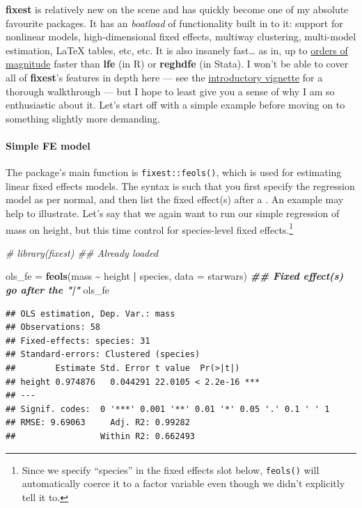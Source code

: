 \documentclass[
]{article}
\newenvironment{Shaded}{\begin{snugshade}}{\end{snugshade}}
\newcommand{\AttributeTok}[1]{\textcolor[rgb]{0.13,0.29,0.53}{#1}}
\newcommand{\CommentTok}[1]{\textcolor[rgb]{0.56,0.35,0.01}{\textit{#1}}}
\newcommand{\DocumentationTok}[1]{\textcolor[rgb]{0.56,0.35,0.01}{\textbf{\textit{#1}}}}
\newcommand{\FunctionTok}[1]{\textcolor[rgb]{0.13,0.29,0.53}{\textbf{#1}}}
\newcommand{\NormalTok}[1]{#1}
\newcommand{\OtherTok}[1]{\textcolor[rgb]{0.56,0.35,0.01}{#1}}
\newcommand{\SpecialCharTok}[1]{\textcolor[rgb]{0.81,0.36,0.00}{\textbf{#1}}}
\begin{document}
\textbf{fixest} is relatively new on the scene and has quickly become
one of my absolute favourite packages. It has an \emph{boatload} of
functionality built in to it: support for nonlinear models,
high-dimensional fixed effects, multiway clustering, multi-model
estimation, LaTeX tables, etc, etc. It is also insanely fast\ldots{} as
in, up to \href{https://lrberge.github.io/fixest/\#benchmarking}{orders
of magnitude} faster than \textbf{lfe} (in R) or \textbf{reghdfe} (in
Stata). I won't be able to cover all of \textbf{fixest}'s features in
depth here --- see the
\href{https://lrberge.github.io/fixest/articles/fixest_walkthrough.html}{introductory
vignette} for a thorough walkthrough --- but I hope to least give you a
sense of why I am so enthusiastic about it. Let's start off with a
simple example before moving on to something slightly more demanding.

\hypertarget{simple-fe-model}{%
\paragraph{Simple FE model}\label{simple-fe-model}}

The package's main function is \texttt{fixest::feols()}, which is used
for estimating linear fixed effects models. The syntax is such that you
first specify the regression model as per normal, and then list the
fixed effect(s) after a \texttt{\textbar{}}. An example may help to
illustrate. Let's say that we again want to run our simple regression of
mass on height, but this time control for species-level fixed
effects.\footnote{Since we specify ``species'' in the fixed effects slot
  below, \texttt{feols()} will automatically coerce it to a factor
  variable even though we didn't explicitly tell it to.}

\begin{Shaded}
\begin{Highlighting}[]
\CommentTok{\# library(fixest) \#\# Already loaded}

\NormalTok{ols\_fe }\OtherTok{=} \FunctionTok{feols}\NormalTok{(mass }\SpecialCharTok{\textasciitilde{}}\NormalTok{ height }\SpecialCharTok{|}\NormalTok{ species, }\AttributeTok{data =}\NormalTok{ starwars) }\DocumentationTok{\#\# Fixed effect(s) go after the "|"}
\NormalTok{ols\_fe}
\end{Highlighting}
\end{Shaded}

\begin{verbatim}
## OLS estimation, Dep. Var.: mass
## Observations: 58 
## Fixed-effects: species: 31
## Standard-errors: Clustered (species) 
##        Estimate Std. Error t value  Pr(>|t|)    
## height 0.974876   0.044291 22.0105 < 2.2e-16 ***
## ---
## Signif. codes:  0 '***' 0.001 '**' 0.01 '*' 0.05 '.' 0.1 ' ' 1
## RMSE: 9.69063     Adj. R2: 0.99282 
##                 Within R2: 0.662493
\end{verbatim}
\end{document}
